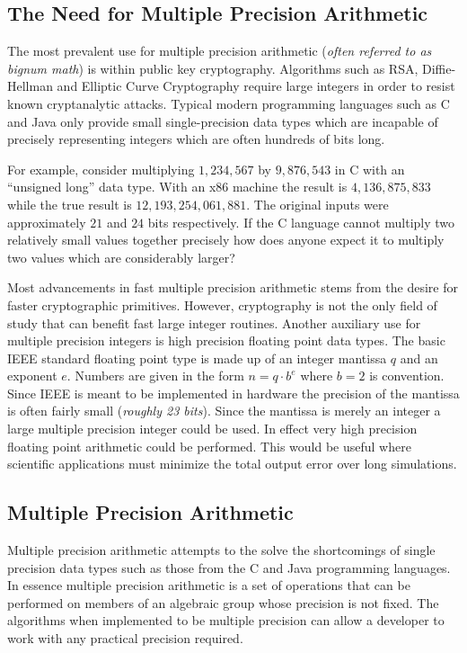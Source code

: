\documentclass[b5paper]{book}
\begin{document}
\subsection{The Need for Multiple Precision Arithmetic}
The most prevalent use for multiple precision arithmetic (\textit{often referred to as bignum math}) is within public
key cryptography.   Algorithms such as RSA, Diffie-Hellman and Elliptic Curve Cryptography require large integers in order to 
resist known cryptanalytic attacks.  Typical modern programming languages such as C and Java only provide small 
single-precision data types which are incapable of precisely representing integers which are often hundreds of bits long.

For example, consider multiplying $1,234,567$ by $9,876,543$ in C with an ``unsigned long'' data type.  With an 
x86 machine the result is $4,136,875,833$ while the true result is $12,193,254,061,881$.  The original inputs 
were approximately $21$ and $24$ bits respectively.  If the C language cannot multiply two relatively small values 
together precisely how does anyone expect it to multiply two values which are considerably larger?

Most advancements in fast multiple precision arithmetic stems from the desire for faster cryptographic primitives.  However, cryptography
is not the only field of study that can benefit fast large integer routines.  Another auxiliary use for multiple precision integers is 
high precision floating point data types.  The basic IEEE standard floating point type is made up of an integer mantissa $q$ and an exponent $e$.  
Numbers are given in the form $n = q \cdot b^e$ where $b = 2$ is convention.  Since IEEE is meant to be implemented in 
hardware the precision of the mantissa is often fairly small (\textit{roughly 23 bits}).  Since the mantissa is merely an 
integer a large multiple precision integer could be used.  In effect very high precision floating point arithmetic 
could be performed.  This would be useful where scientific applications must minimize the total output error over long simulations.  

\subsection{Multiple Precision Arithmetic}
Multiple precision arithmetic attempts to the solve the shortcomings of single precision data types such as those from
the C and Java programming languages.  In essence multiple precision arithmetic is a set of operations that can be 
performed on members of an algebraic group whose precision is not fixed.  The algorithms when implemented to be multiple
precision can allow a developer to work with any practical precision required.
\end{document}
